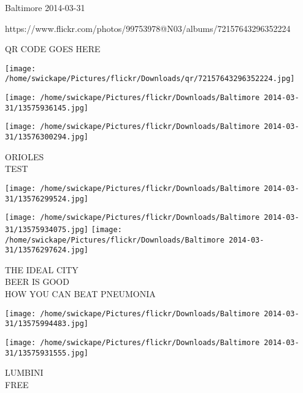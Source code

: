 \documentclass[10pt,letterpaper]{article}
\begin{document}
Baltimore 2014-03-31

https://www.flickr.com/photos/99753978@N03/albums/72157643296352224

QR CODE GOES HERE

\texttt{[image: /home/swickape/Pictures/flickr/Downloads/qr/72157643296352224.jpg]}
\pagebreak

\texttt{[image: /home/swickape/Pictures/flickr/Downloads/Baltimore 2014-03-31/13575936145.jpg]}

\vspace{0.25in}
\texttt{[image: /home/swickape/Pictures/flickr/Downloads/Baltimore 2014-03-31/13576300294.jpg]}

ORIOLES\\
TEST\\
\pagebreak

\texttt{[image: /home/swickape/Pictures/flickr/Downloads/Baltimore 2014-03-31/13576299524.jpg]}

\vspace{0.25in}
\texttt{[image: /home/swickape/Pictures/flickr/Downloads/Baltimore 2014-03-31/13575934075.jpg]}
\texttt{[image: /home/swickape/Pictures/flickr/Downloads/Baltimore 2014-03-31/13576297624.jpg]}

THE IDEAL CITY\\
BEER IS GOOD\\
HOW YOU CAN BEAT PNEUMONIA\\
\pagebreak

\texttt{[image: /home/swickape/Pictures/flickr/Downloads/Baltimore 2014-03-31/13575994483.jpg]}

\vspace{0.25in}
\texttt{[image: /home/swickape/Pictures/flickr/Downloads/Baltimore 2014-03-31/13575931555.jpg]}

LUMBINI\\
FREE\\
\pagebreak
\end{document}
